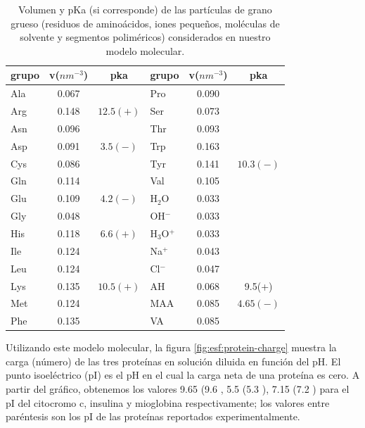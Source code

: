 \begin{table}
\centering
\small
\begin{tabular}{|lcc|lcc|}
\hline
grupo & v($nm^{-3}$) & pka & grupo & v($nm^{-3}$) & pka \\
\hline
Ala & 0.067 &  & Pro & 0.090 & \\
Arg & 0.148 & $12.5 (+)$& Ser & 0.073 &\\
Asn & 0.096 &  & Thr & 0.093 & \\
Asp & 0.091 & $3.5 (-)$ & Trp & 0.163 &\\
Cys & 0.086 &  & Tyr & 0.141 & $10.3 (-)$\\
Gln & 0.114 & & Val & 0.105 &\\  
Glu & 0.109 & $4.2 (-)$ & H$_2$O & 0.033 & \\ 
Gly & 0.048 &  & OH$^-$ & 0.033 & \\
His & 0.118 & $6.6 (+)$& H$_3$O$^+$ & 0.033 &  \\ 
Ile & 0.124 &  & Na$^+$ & 0.043 & \\ %
Leu & 0.124 &  & Cl$^-$ & 0.047 & \\
Lys & 0.135 & $10.5 (+)$ & AH & 0.068 &  9.5(+)\\
Met & 0.124 & & MAA & 0.085 & $4.65(-)$\\
Phe & 0.135 &   & VA & 0.085 & \\
\hline
\end{tabular}
\caption{Volumen y pKa (si corresponde) de las part\'iculas de grano grueso (residuos de amino\'acidos, iones peque\~nos, mol\'eculas de solvente y segmentos polim\'ericos) considerados en nuestro modelo molecular.}
\label{table:Coarse-grain} 
\end{table}


Utilizando este modelo molecular, la figura \ref{fig:esf:protein-charge} muestra la carga (n\'umero) de las tres prote\'inas en soluci\'on diluida en funci\'on del pH.
El punto isoel\'ectrico (pI) es el pH en el cual la carga neta de una prote\'ina es cero.
A partir del gr\'afico, obtenemos los valores 9.65 (9.6 \cite{hristova2019isoelectric}, 5.5 (5.3 \cite{guckeisen2019isoelectric}), 7.15 (7.2 \cite{batys2020myoglobin}) para el pI del citocromo c, insulina y mioglobina respectivamente;
los valores entre par\'entesis son los pI de las prote\'inas reportados experimentalmente.


